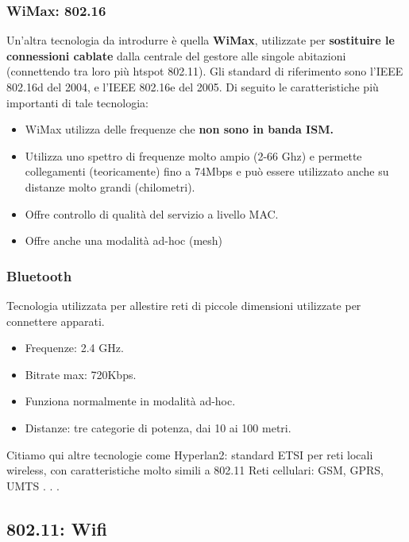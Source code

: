 \documentclass[12pt]{article}
\begin{document}
			\subsubsection{WiMax: 802.16}
				Un'altra tecnologia da introdurre è quella \textbf{WiMax}, utilizzate per \textbf{sostituire le connessioni cablate} dalla centrale del gestore alle singole abitazioni (connettendo tra loro più htspot 802.11). Gli standard di riferimento sono l’IEEE 802.16d del 2004, e l’IEEE 802.16e del 2005. Di seguito le caratteristiche più importanti di tale tecnologia:
				\begin{itemize}
					\item WiMax utilizza delle frequenze che \textbf{non sono in banda ISM.}
					\item Utilizza uno spettro di frequenze molto ampio (2-66 Ghz) e permette collegamenti (teoricamente) fino a 74Mbps e può essere utilizzato anche su distanze molto grandi (chilometri).
					\item Offre controllo di qualità del servizio a livello MAC.
					\item Offre anche una modalità ad-hoc (mesh)
				\end{itemize} 
			\subsubsection{Bluetooth}
				Tecnologia utilizzata per allestire reti di piccole dimensioni utilizzate per connettere apparati.
				\begin{itemize}
					\item  Frequenze: 2.4 GHz.
					\item Bitrate max: 720Kbps.
					\item Funziona normalmente in modalità ad-hoc.
					\item Distanze: tre categorie di potenza, dai 10 ai 100 metri.
				\end{itemize}
				Citiamo qui altre tecnologie come  Hyperlan2: standard ETSI per reti locali wireless, con
				caratteristiche molto simili a 802.11
				Reti cellulari: GSM, GPRS, UMTS . . .
		\subsection{802.11: Wifi}
\end{document}
